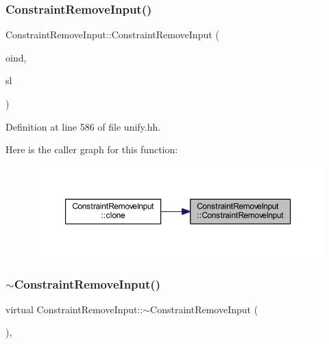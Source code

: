 \subsubsection{\texorpdfstring{ConstraintRemoveInput()}{ConstraintRemoveInput()}}
{\footnotesize\ttfamily Constraint\+Remove\+Input\+::\+Constraint\+Remove\+Input (\begin{DoxyParamCaption}\item[{int4}]{oind,  }\item[{\mbox{\hyperlink{class_r_h_s_constant}{R\+H\+S\+Constant}} $\ast$}]{sl }\end{DoxyParamCaption})\hspace{0.3cm}{\ttfamily [inline]}}



Definition at line 586 of file unify.\+hh.

Here is the caller graph for this function\+:
\nopagebreak
\begin{figure}[H]
\begin{center}
\leavevmode
\includegraphics[width=350pt]{class_constraint_remove_input_a45e8c0eaebefde80e445d3cc1912c27b_icgraph}
\end{center}
\end{figure}
\mbox{\label{class_constraint_remove_input_a56450fd325c9f096fded3544210d182a}} 
\subsubsection{\texorpdfstring{$\sim$ConstraintRemoveInput()}{~ConstraintRemoveInput()}}
{\footnotesize\ttfamily virtual Constraint\+Remove\+Input\+::$\sim$\+Constraint\+Remove\+Input (\begin{DoxyParamCaption}\item[{void}]{ }\end{DoxyParamCaption})\hspace{0.3cm}{\ttfamily [inline]}, {\ttfamily [virtual]}}



